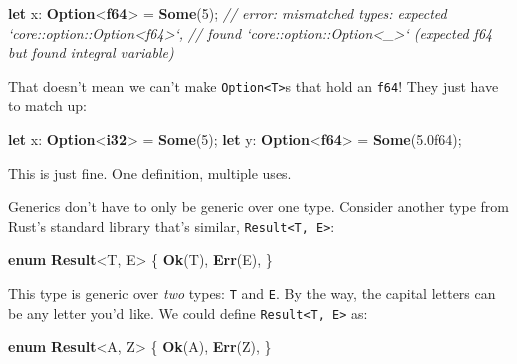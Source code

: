 \documentclass[a4paper,]{book}
\newenvironment{Shaded}{\begin{snugshade}}{\end{snugshade}}
\newcommand{\KeywordTok}[1]{\textcolor[rgb]{0.13,0.29,0.53}{\textbf{{#1}}}}
\newcommand{\DecValTok}[1]{\textcolor[rgb]{0.00,0.00,0.81}{{#1}}}
\newcommand{\CommentTok}[1]{\textcolor[rgb]{0.56,0.35,0.01}{\textit{{#1}}}}
\newcommand{\NormalTok}[1]{{#1}}
\begin{document}
\begin{Shaded}
\begin{Highlighting}[]
\KeywordTok{let} \NormalTok{x: }\KeywordTok{Option}\NormalTok{<}\KeywordTok{f64}\NormalTok{> = }\KeywordTok{Some}\NormalTok{(}\DecValTok{5}\NormalTok{);}
\CommentTok{// error: mismatched types: expected `core::option::Option<f64>`,}
\CommentTok{// found `core::option::Option<_>` (expected f64 but found integral variable)}
\end{Highlighting}
\end{Shaded}

That doesn't mean we can't make
\texttt{Option\textless{}T\textgreater{}}s that hold an \texttt{f64}!
They just have to match up:

\begin{Shaded}
\begin{Highlighting}[]
\KeywordTok{let} \NormalTok{x: }\KeywordTok{Option}\NormalTok{<}\KeywordTok{i32}\NormalTok{> = }\KeywordTok{Some}\NormalTok{(}\DecValTok{5}\NormalTok{);}
\KeywordTok{let} \NormalTok{y: }\KeywordTok{Option}\NormalTok{<}\KeywordTok{f64}\NormalTok{> = }\KeywordTok{Some}\NormalTok{(}\DecValTok{5.0f64}\NormalTok{);}
\end{Highlighting}
\end{Shaded}

This is just fine. One definition, multiple uses.

Generics don't have to only be generic over one type. Consider another
type from Rust's standard library that's similar,
\texttt{Result\textless{}T,\ E\textgreater{}}:

\begin{Shaded}
\begin{Highlighting}[]
\KeywordTok{enum} \KeywordTok{Result}\NormalTok{<T, E> \{}
    \KeywordTok{Ok}\NormalTok{(T),}
    \KeywordTok{Err}\NormalTok{(E),}
\NormalTok{\}}
\end{Highlighting}
\end{Shaded}

This type is generic over \emph{two} types: \texttt{T} and \texttt{E}.
By the way, the capital letters can be any letter you'd like. We could
define \texttt{Result\textless{}T,\ E\textgreater{}} as:

\begin{Shaded}
\begin{Highlighting}[]
\KeywordTok{enum} \KeywordTok{Result}\NormalTok{<A, Z> \{}
    \KeywordTok{Ok}\NormalTok{(A),}
    \KeywordTok{Err}\NormalTok{(Z),}
\NormalTok{\}}
\end{Highlighting}
\end{Shaded}
\end{document}
